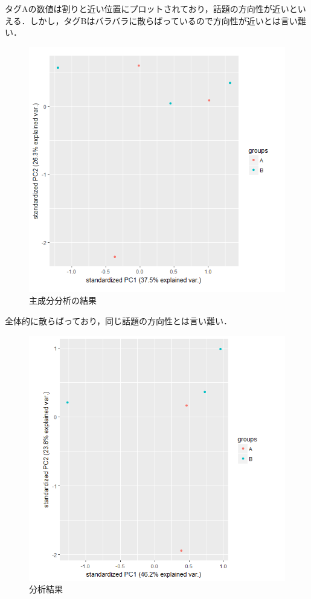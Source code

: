 タグAの数値は割りと近い位置にプロットされており，話題の方向性が近いといえる．しかし，タグBはバラバラに散らばっているので方向性が近いとは言い難い．
\begin{figure}[htb]
\centering
\includegraphics[width=13cm]{4-38.png}
\caption{主成分分析の結果}\label{4-38}
\end{figure}
\newpage

全体的に散らばっており，同じ話題の方向性とは言い難い．
\begin{figure}[htb]
\centering
\includegraphics[width=13cm]{5-3.png}
\caption{分析結果}\label{5-3}
\end{figure}
\newpage


